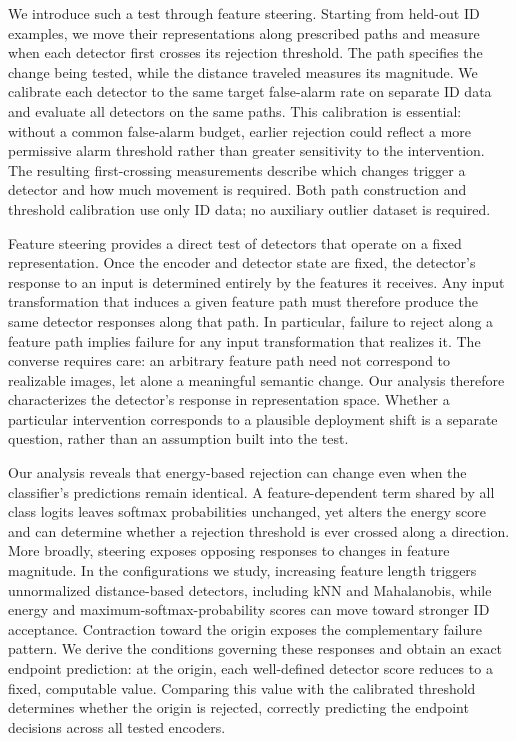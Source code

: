 \documentclass[twoside]{article}
\theoremstyle{definition}
\theoremstyle{remark}
\begin{document}
We introduce such a test through feature steering. Starting from held-out ID examples, we move their representations along prescribed paths and measure when each detector first crosses its rejection threshold. The path specifies the change being tested, while the distance traveled measures its magnitude. We calibrate each detector to the same target false-alarm rate on separate ID data and evaluate all detectors on the same paths. This calibration is essential: without a common false-alarm budget, earlier rejection could reflect a more permissive alarm threshold rather than greater sensitivity to the intervention. The resulting first-crossing measurements describe which changes trigger a detector and how much movement is required. Both path construction and threshold calibration use only ID data; no auxiliary outlier dataset is required.

Feature steering provides a direct test of detectors that operate on a fixed representation. Once the encoder and detector state are fixed, the detector’s response to an input is determined entirely by the features it receives. Any input transformation that induces a given feature path must therefore produce the same detector responses along that path. In particular, failure to reject along a feature path implies failure for any input transformation that realizes it. The converse requires care: an arbitrary feature path need not correspond to realizable images, let alone a meaningful semantic change. Our analysis therefore characterizes the detector’s response in representation space. Whether a particular intervention corresponds to a plausible deployment shift is a separate question, rather than an assumption built into the test.

Our analysis reveals that energy-based rejection can change even when the classifier’s predictions remain identical. A feature-dependent term shared by all class logits leaves softmax probabilities unchanged, yet alters the energy score and can determine whether a rejection threshold is ever crossed along a direction. More broadly, steering exposes opposing responses to changes in feature magnitude. In the configurations we study, increasing feature length triggers unnormalized distance-based detectors, including kNN and Mahalanobis, while energy and maximum-softmax-probability scores can move toward stronger ID acceptance. Contraction toward the origin exposes the complementary failure pattern. We derive the conditions governing these responses and obtain an exact endpoint prediction: at the origin, each well-defined detector score reduces to a fixed, computable value. Comparing this value with the calibrated threshold determines whether the origin is rejected, correctly predicting the endpoint decisions across all tested encoders.
\end{document}
